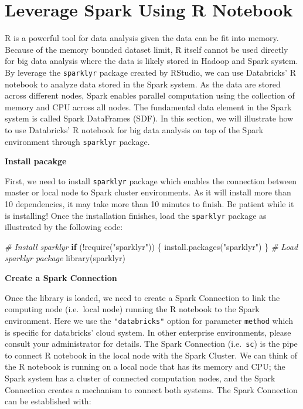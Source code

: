 \documentclass[
  12pt,
]{krantz}
\makeatletter
\newenvironment{Shaded}{\begin{snugshade}}{\end{snugshade}}
\newcommand{\CommentTok}[1]{\textcolor[rgb]{0.37,0.37,0.37}{\textit{#1}}}
\newcommand{\ControlFlowTok}[1]{\textcolor[rgb]{0.27,0.27,0.27}{\textbf{#1}}}
\newcommand{\FunctionTok}[1]{\textcolor[rgb]{0,0,0}{#1}}
\newcommand{\NormalTok}[1]{#1}
\newcommand{\SpecialCharTok}[1]{\textcolor[rgb]{0,0,0}{#1}}
\newcommand{\StringTok}[1]{\textcolor[rgb]{0.5,0.5,0.5}{#1}}
\newenvironment{kframe}{%
\medskip{}
\setlength{\fboxsep}{.8em}
 \def\at@end@of@kframe{}%
 \ifinner\ifhmode%
  \def\at@end@of@kframe{\end{minipage}}%
  \begin{minipage}{\columnwidth}%
 \fi\fi%
 \def\FrameCommand##1{\hskip\@totalleftmargin \hskip-\fboxsep
 \colorbox{shadecolor}{##1}\hskip-\fboxsep
     \hskip-\linewidth \hskip-\@totalleftmargin \hskip\columnwidth}%
 \MakeFramed {\advance\hsize-\width
   \@totalleftmargin\z@ \linewidth\hsize
   \@setminipage}}%
 {\par\unskip\endMakeFramed%
 \at@end@of@kframe}
\renewenvironment{Shaded}{\begin{kframe}}{\end{kframe}}
\makeatother
\begin{document}
\hypertarget{leveragesparkr}{%
\section{Leverage Spark Using R Notebook}\label{leveragesparkr}}

R is a powerful tool for data analysis given the data can be fit into memory. Because of the memory bounded dataset limit, R itself cannot be used directly for big data analysis where the data is likely stored in Hadoop and Spark system. By leverage the \texttt{sparklyr} package created by RStudio, we can use Databricks' R notebook to analyze data stored in the Spark system. As the data are stored across different nodes, Spark enables parallel computation using the collection of memory and CPU across all nodes. The fundamental data element in the Spark system is called Spark DataFrames (SDF). In this section, we will illustrate how to use Databricks' R notebook for big data analysis on top of the Spark environment through \texttt{sparklyr} package.

\textbf{Install pacakge}

First, we need to install \texttt{sparklyr} package which enables the connection between master or local node to Spark cluster environments. As it will install more than 10 dependencies, it may take more than 10 minutes to finish. Be patient while it is installing! Once the installation finishes, load the \texttt{sparklyr} package as illustrated by the following code:

\begin{Shaded}
\begin{Highlighting}[]
\CommentTok{\# Install sparklyr}
\ControlFlowTok{if}\NormalTok{ (}\SpecialCharTok{!}\FunctionTok{require}\NormalTok{(}\StringTok{"sparklyr"}\NormalTok{)) \{}
\FunctionTok{install.packages}\NormalTok{(}\StringTok{"sparklyr"}\NormalTok{)}
\NormalTok{\}}
\CommentTok{\# Load sparklyr package}
\FunctionTok{library}\NormalTok{(sparklyr)}
\end{Highlighting}
\end{Shaded}

\textbf{Create a Spark Connection}

Once the library is loaded, we need to create a Spark Connection to link the computing node (i.e.~local node) running the R notebook to the Spark environment. Here we use the \texttt{"databricks"} option for parameter \texttt{method} which is specific for databricks' cloud system. In other enterprise environments, please consult your administrator for details. The Spark Connection (i.e.~\texttt{sc}) is the pipe to connect R notebook in the local node with the Spark Cluster. We can think of the R notebook is running on a local node that has its memory and CPU; the Spark system has a cluster of connected computation nodes, and the Spark Connection creates a mechanism to connect both systems. The Spark Connection can be established with:
\end{document}
